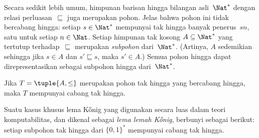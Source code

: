 \documentclass[../../../include/open-logic-section]{subfiles}
\begin{document}
\begin{ex}
Secara sedikit lebih umum, himpunan barisan hingga bilangan asli~$\Nat^*$
dengan relasi perluasan~$\sqsubseteq$ juga merupakan pohon. Jelas bahwa pohon
ini tidak bercabang hingga: setiap $s \in \Nat^*$ mempunyai tak hingga banyak
penerus~$sn$, satu untuk setiap $n \in \Nat$. Setiap himpunan tak kosong
$A \subseteq \Nat^*$ yang tertutup terhadap~$\sqsubseteq$ merupakan
\emph{subpohon} dari~$\Nat^*$.
(Artinya, $A$ sedemikian sehingga jika $s \in A$ dan $s' \sqsubseteq s$, maka
$s' \in A$.) Semua pohon hingga dapat direpresentasikan sebagai subpohon
hingga dari~$\Nat^*$.
\end{ex}

\begin{prop}
Jika $T = \tuple{A,\le}$ merupakan pohon tak hingga yang bercabang hingga,
maka $T$ mempunyai cabang tak hingga.
\end{prop}

Suatu kasus khusus lema K\H{o}nig yang digunakan secara luas dalam teori
komputabilitas, dan dikenal sebagai \emph{lema lemah K\H{o}nig}, berbunyi
sebagai berikut: setiap subpohon tak hingga dari $\{0,1\}^*$ mempunyai cabang
tak hingga.
\end{document}
